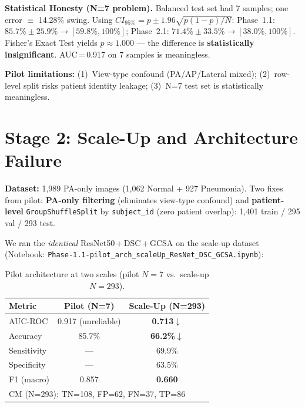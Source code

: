 \documentclass{article}
\begin{document}
\textbf{Statistical Honesty (N=7 problem).} Balanced test set had 7 samples;
one error $\equiv$ 14.28\% swing. Using $CI_{95\%}=p\pm 1.96\sqrt{p(1-p)/N}$:
Phase~1.1: $85.7\%\pm 25.9\% \to [59.8\%,100\%]$;
Phase~2.1: $71.4\%\pm 33.5\% \to [38.0\%,100\%]$.
Fisher's Exact Test yields $p\approx 1.000$ --- the difference is
\textbf{statistically insignificant}. AUC\,=\,0.917 on 7 samples is meaningless.

\textbf{Pilot limitations:} (1)~View-type confound (PA/AP/Lateral mixed);
(2)~row-level split risks patient identity leakage;
(3)~N=7 test set is statistically meaningless.

\section{Stage 2: Scale-Up and Architecture Failure}

\textbf{Dataset:} 1,989 PA-only images (1,062 Normal + 927 Pneumonia).
Two fixes from pilot: \textbf{PA-only filtering} (eliminates view-type confound)
and \textbf{patient-level} \texttt{GroupShuffleSplit} by \texttt{subject\_id}
(zero patient overlap): 1,401 train / 295 val / 293 test.

We ran the \emph{identical} ResNet50\,+\,DSC\,+\,GCSA on the scale-up dataset
(Notebook: \texttt{Phase-1.1-pilot\_arch\_scaleUp\_ResNet\_DSC\_GCSA.ipynb}):

\begin{table}[h]
\centering\small
\setlength{\tabcolsep}{6pt}
\caption{Pilot architecture at two scales (pilot $N{=}7$ vs.\ scale-up $N{=}293$).}
\label{tab:failure}
\begin{tabular}{lcc}
\toprule
\textbf{Metric} & \textbf{Pilot (N=7)} & \textbf{Scale-Up (N=293)}\\
\midrule
AUC-ROC   & 0.917 {\small(unreliable)} & \textbf{0.713}\;$\downarrow$\\
Accuracy  & 85.7\%                     & \textbf{66.2\%}\;$\downarrow$\\
Sensitivity & ---                      & 69.9\%\\
Specificity & ---                      & 63.5\%\\
F1 (macro)& 0.857                      & \textbf{0.660}\\
\midrule
\multicolumn{3}{l}{\small CM (N=293): TN=108, FP=62, FN=37, TP=86}\\
\bottomrule
\end{tabular}
\end{table}
\end{document}
